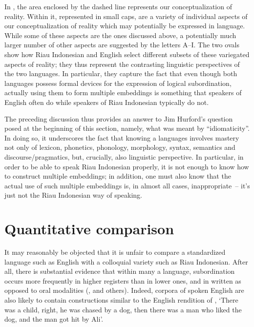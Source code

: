 \documentclass[output=paper]{langscibook}
\begin{document}
In , the area enclosed by the dashed line represents our conceptualization of reality.  Within it, represented in small caps, are a variety of individual aspects of our conceptualization of reality which may potentially be expressed in language.  While some of these aspects are the ones discussed above, a potentially much larger number of other aspects are suggested by the letters A–I.  The two ovals show how Riau Indonesian and English select different subsets of these variegated aspects of reality; they thus represent the contrasting linguistic perspectives of the two languages.  In particular, they capture the fact that even though both languages possess formal devices for the expression of logical subordination, actually using them to form multiple embeddings is something that speakers of English often do while speakers of Riau Indonesian typically do not.

The preceding discussion thus provides an answer to Jim Hurford's question posed at the beginning of this section, namely, what was meant by ``idiomaticity''.  In doing so, it underscores the fact that knowing a languages involves mastery not only of lexicon, phonetics, phonology, morphology, syntax, semantics and discourse/pragmatics, but, crucially, also linguistic perspective.  In particular, in order to be able to speak Riau Indonesian properly, it is not enough to know how to construct multiple embeddings; in addition, one must also know that the actual use of such multiple embeddings is, in almost all cases, inappropriate~– it's just not the Riau Indonesian way of speaking.

\section{Quantitative comparison}
It may reasonably be objected that it is unfair to compare a standardized language such as English with a colloquial variety such as Riau Indonesian.  After all, there is substantial evidence that within many a language, subordination occurs more frequently in higher registers than in lower ones, and in written as opposed to oral modalities (\citealt{givon1979understanding,deutscher2000syntactic,karlsson2009aorigin,karlsson2009bsyntactic}, and others). Indeed, corpora of spoken English are also likely to contain constructions similar to the English rendition of , `There was a child, right, he was chased by a dog, then there was a man who liked the dog, and the man got hit by Ali'. 
\end{document}
